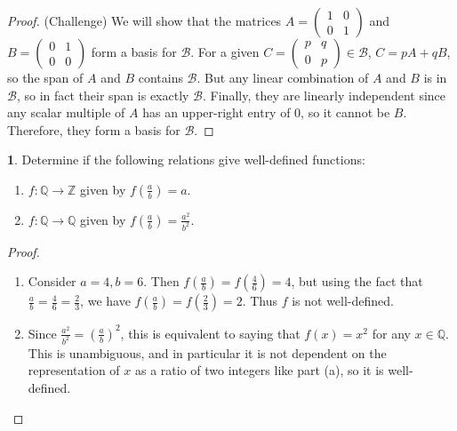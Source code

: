 \documentclass[12pt]{article}
\theoremstyle{definition}
\newtheorem{ex}{}
\begin{document}
\begin{proof}
	(Challenge) We will show that the matrices $A = \begin{pmatrix}1 & 0 \\ 0 & 1\end{pmatrix}$ and $B = \begin{pmatrix}0 & 1 \\ 0 & 0\end{pmatrix}$ form a basis for $\mathcal{B}$.
	For a given $C = \begin{pmatrix}p & q \\ 0 & p\end{pmatrix} \in \mathcal{B}$, $C = pA + qB$, so the span of $A$ and $B$ contains $\mathcal{B}$.
	But any linear combination of $A$ and $B$ is in $\mathcal{B}$, so in fact their span is exactly $\mathcal{B}$.
	Finally, they are linearly independent since any scalar multiple of $A$ has an upper-right entry of 0, so it cannot be $B$.
	Therefore, they form a basis for $\mathcal{B}$.
\end{proof}

\begin{ex}
	Determine if the following relations give well-defined functions:
	\begin{enumerate}[label=(\alph*)]
		\item $f : \mathbb{Q} \to \mathbb{Z}$ given by $f(\frac{a}{b}) = a$.
		\item $f : \mathbb{Q} \to \mathbb{Q}$ given by $f(\frac{a}{b}) = \frac{a^2}{b^2}$.
	\end{enumerate}
\end{ex}
\begin{proof}\
	\begin{enumerate}[label=(\alph*)]
		\item Consider $a=4, b=6$.
		      Then $f\left(\frac{a}{b}\right) = f\left(\frac{4}{6}\right) = 4$, but using the fact that $\frac{a}{b} = \frac{4}{6} = \frac{2}{3}$, we have $f\left(\frac{a}{b}\right) = f\left(\frac{2}{3}\right) = 2$.
		      Thus $f$ is not well-defined.
		\item Since $\frac{a^2}{b^2} = \left( \frac{a}{b} \right)^2$, this is equivalent to saying that $f(x) = x^2$ for any $x \in \mathbb{Q}$.
		      This is unambiguous, and in particular it is not dependent on the representation of $x$ as a ratio of two integers like part (a), so it is well-defined.
	\end{enumerate}
\end{proof}
\end{document}
